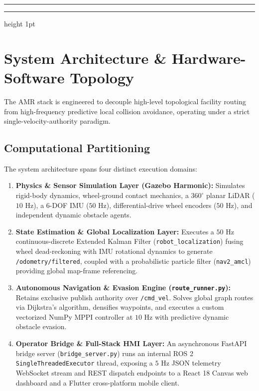 \documentclass[10pt,a4paper]{article}
\begin{document}
\vspace{0.2cm}
\hrule
\vspace{0.3cm}

\tableofcontents
\vspace{0.4cm}
\hrule height 1pt
\vspace{0.5cm}

\section{System Architecture \& Hardware-Software Topology}

The AMR stack is engineered to decouple high-level topological facility routing from high-frequency predictive local collision avoidance, operating under a strict single-velocity-authority paradigm.

\subsection{Computational Partitioning}
The system architecture spans four distinct execution domains:
\begin{enumerate}
    \item \textbf{Physics \& Sensor Simulation Layer (Gazebo Harmonic):} Simulates rigid-body dynamics, wheel-ground contact mechanics, a $360^\circ$ planar LiDAR ($10\text{ Hz}$), a $6$-DOF IMU ($50\text{ Hz}$), differential-drive wheel encoders ($50\text{ Hz}$), and independent dynamic obstacle agents.
    \item \textbf{State Estimation \& Global Localization Layer:} Executes a $50\text{ Hz}$ continuous-discrete Extended Kalman Filter (\texttt{robot\_localization}) fusing wheel dead-reckoning with IMU rotational dynamics to generate \texttt{/odometry/filtered}, coupled with a probabilistic particle filter (\texttt{nav2\_amcl}) providing global map-frame referencing.
    \item \textbf{Autonomous Navigation \& Evasion Engine (\texttt{route\_runner.py}):} Retains exclusive publish authority over \texttt{/cmd\_vel}. Solves global graph routes via Dijkstra's algorithm, densifies waypoints, and executes a custom vectorized NumPy MPPI controller at $10\text{ Hz}$ with predictive dynamic obstacle evasion.
    \item \textbf{Operator Bridge \& Full-Stack HMI Layer:} An asynchronous FastAPI bridge server (\texttt{bridge\_server.py}) runs an internal ROS 2 \texttt{SingleThreadedExecutor} thread, exposing a $5\text{ Hz}$ JSON telemetry WebSocket stream and REST dispatch endpoints to a React 18 Canvas web dashboard and a Flutter cross-platform mobile client.
\end{enumerate}
\end{document}
